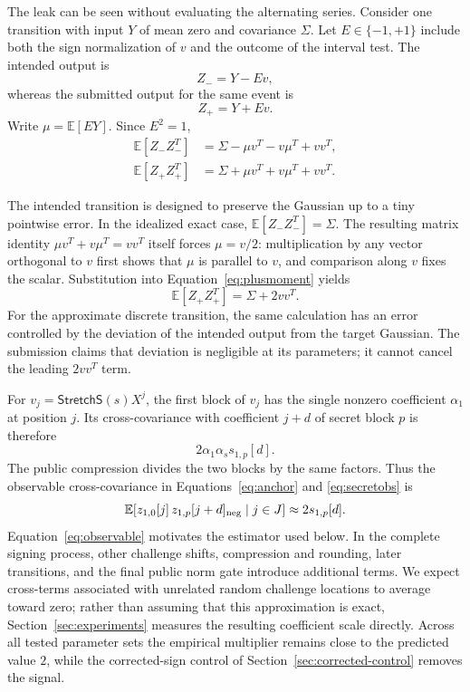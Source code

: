 \documentclass[11pt,a4paper]{article}
\newcommand{\E}{\mathbb{E}}
\newcommand{\Stretch}{\mathsf{StretchS}}
\begin{document}
The leak can be seen without evaluating the alternating series.  Consider one
transition with input $Y$ of mean zero and covariance $\Sigma$.  Let
$E\in\{-1,+1\}$ include both the sign normalization of $v$ and the outcome of
the interval test.  The intended output is
\[
                         Z_-=Y-Ev,
\]
whereas the submitted output for the same event is
\[
                         Z_+=Y+Ev.
\]
Write $\mu=\E[EY]$.  Since $E^2=1$,
\begin{align}
 \E[Z_-Z_-^T]
    &=\Sigma-\mu v^T-v\mu^T+vv^T,\label{eq:minusmoment}\\
 \E[Z_+Z_+^T]
    &=\Sigma+\mu v^T+v\mu^T+vv^T.\label{eq:plusmoment}
\end{align}

The intended transition is designed to preserve the Gaussian up to a tiny
pointwise error.  In the idealized exact case,
$\E[Z_-Z_-^T]=\Sigma$.  The resulting matrix identity
$\mu v^T+v\mu^T=vv^T$ itself forces $\mu=v/2$: multiplication by any vector
orthogonal to $v$ first shows that $\mu$ is parallel to $v$, and comparison
along $v$ fixes the scalar.  Substitution into
Equation~\eqref{eq:plusmoment} yields
\begin{equation}
                     \E[Z_+Z_+^T]=\Sigma+2vv^T.
\label{eq:rankone}
\end{equation}
For the approximate discrete transition, the same calculation has an error
controlled by the deviation of the intended output from the target Gaussian.
The submission claims that deviation is negligible at its parameters; it
cannot cancel the leading $2vv^T$ term.

For $v_j=\Stretch(s)X^j$, the first block of $v_j$ has the single nonzero
coefficient $\alpha_1$ at position $j$.  Its cross-covariance with coefficient
$j+d$ of secret block $p$ is therefore
\[
              2\alpha_1\alpha_s s_{1,p}[d].
\]
The public compression divides the two blocks by the same factors.  Thus the
observable cross-covariance in Equations~\eqref{eq:anchor} and
\eqref{eq:secretobs} is
\begin{equation}
 \E\!\left[z_{1,0}[j]\,
       z_{1,p}[j+d]_{\rm neg}\mid j\in J\right]
            \approx 2s_{1,p}[d].
\label{eq:observable}
\end{equation}
Equation~\eqref{eq:observable} motivates the estimator used below.  In the
complete signing process, other challenge shifts, compression and rounding,
later transitions, and the final public norm gate introduce additional terms.
We expect cross-terms associated with unrelated random challenge locations to
average toward zero; rather than assuming that this approximation is exact,
Section~\ref{sec:experiments} measures the resulting coefficient scale
directly.  Across all tested parameter sets the empirical multiplier remains
close to the predicted value $2$, while the corrected-sign control of
Section~\ref{sec:corrected-control} removes the signal.
\end{document}
